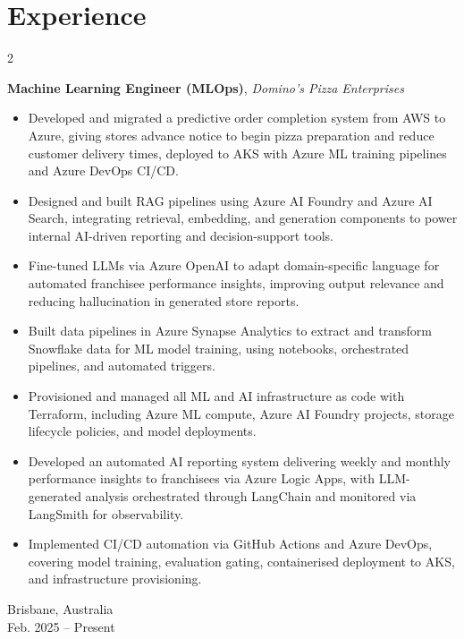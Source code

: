 \documentclass[10pt, letterpaper]{article}
\newenvironment{highlights}{
    \begin{itemize}[
        topsep=0.10 cm,
        parsep=0.10 cm,
        partopsep=0pt,
        itemsep=0pt,
        leftmargin=0.4 cm + 10pt
    ]
}{
    \end{itemize}
} %
\newenvironment{twocolentry}[2][]{
    \onecolentry
    \def\secondColumn{#2}
    \setcolumnwidth{\fill, 4.5 cm}
    \begin{paracol}{2}
}{
    \switchcolumn \raggedleft \secondColumn
    \end{paracol}
    \endonecolentry
} %
\begin{document}
  \section{Experience}
\begin{twocolentry}{
    Brisbane, Australia\\
    Feb. 2025 -- Present
}
\textbf{Machine Learning Engineer (MLOps)}, \textit{Domino's Pizza Enterprises}
\begin{highlights}
    \item Developed and migrated a predictive order completion system from AWS to Azure, giving stores advance notice to begin pizza preparation and reduce customer delivery times, deployed to AKS with Azure ML training pipelines and Azure DevOps CI/CD.
    \item Designed and built RAG pipelines using Azure AI Foundry and Azure AI Search, integrating retrieval, embedding, and generation components to power internal AI-driven reporting and decision-support tools.
    \item Fine-tuned LLMs via Azure OpenAI to adapt domain-specific language for automated franchisee performance insights, improving output relevance and reducing hallucination in generated store reports.
    \item Built data pipelines in Azure Synapse Analytics to extract and transform Snowflake data for ML model training, using notebooks, orchestrated pipelines, and automated triggers.
    \item Provisioned and managed all ML and AI infrastructure as code with Terraform, including Azure ML compute, Azure AI Foundry projects, storage lifecycle policies, and model deployments.
    \item Developed an automated AI reporting system delivering weekly and monthly performance insights to franchisees via Azure Logic Apps, with LLM-generated analysis orchestrated through LangChain and monitored via LangSmith for observability.
    \item Implemented CI/CD automation via GitHub Actions and Azure DevOps, covering model training, evaluation gating, containerised deployment to AKS, and infrastructure provisioning.
\end{highlights}
\end{twocolentry}
\end{document}
